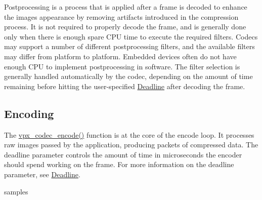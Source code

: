 Postprocessing is a process that is applied after a frame is decoded to enhance the image\textquotesingle{}s appearance by removing artifacts introduced in the compression process. It is not required to properly decode the frame, and is generally done only when there is enough spare C\+PU time to execute the required filters. Codecs may support a number of different postprocessing filters, and the available filters may differ from platform to platform. Embedded devices often do not have enough C\+PU to implement postprocessing in software. The filter selection is generally handled automatically by the codec, depending on the amount of time remaining before hitting the user-\/specified \hyperlink{usage_usage_deadline}{Deadline} after decoding the frame. \hypertarget{usage_encode}{}\subsection{Encoding}\label{usage_encode}
The \hyperlink{group__encoder_gaf990542e2aeb389f05fae3e9c7803639}{vpx\+\_\+codec\+\_\+encode()} function is at the core of the encode loop. It processes raw images passed by the application, producing packets of compressed data. The {\ttfamily deadline} parameter controls the amount of time in microseconds the encoder should spend working on the frame. For more information on the {\ttfamily deadline} parameter, see \hyperlink{usage_usage_deadline}{Deadline}.

samples 